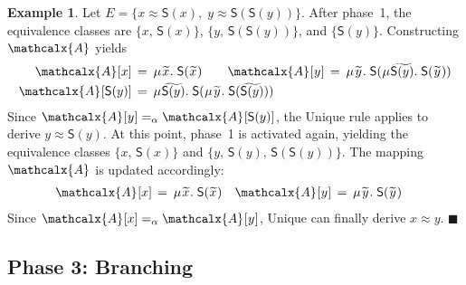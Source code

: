\documentclass[letter]{article}
\newcommand\yasx{\mskip.5mu y\mskip.5mu} %
\newcommand\MU{\vvthinspace\mu\vvthinspace}
\theoremstyle{plain}
\theoremstyle{definition}
\newtheorem{examplex}{Example}%
\newcommand\const[1]{\textsf{#1}}
\newcommand\xend{{\hfill$\scriptstyle\blacksquare$}}
\newcommand{\Ec}{E}
\newcommand{\rn}[1]{\textsf{#1}}
\newcommand{\teq}{\approx}
\newcommand{\ec}[1]{[#1]}
\newcommand{\Val}{\mathcalx{A}\vvthinspace}
\newcommand{\Varec}[1]{\vvthinspace\widetilde{#1}\vvthinspace}
\newcommand{\VAREC}[1]{\widetilde{\vphantom{\scriptstyle x^i}\smash{#1}}}
\newcommand{\aequiv}{\mathrel{=_\alpha}}
\newcommand\vvthinspace{\kern+0.041667em}
\begin{document}

\begin{examplex}
Let $\Ec = \{ x \teq \const{S}(x),\; y \teq \const{S}(\const{S}(y)) \}$.
After phase~1, the equivalence classes %
are
$\{ x,\, \const{S}(x) \}$,
$\{ y,\, \const{S}(\const{S}(y)) \}$,
and $\{ \const{S}(y) \}$.
Constructing $\Val$ yields
\begin{align*}
\Val \ec{x} & \,=\, \MU {\Varec{x}}.\; \const{S}(\Varec{x}) 
\kern2.0em %
\Val \ec{\yasx}  \,=\,
\MU {\Varec{\yasx}}.\; \const{S}(\smash{\MU {\VAREC{\const{S}(y)}}}.\; \const{S}( {\Varec{\yasx}} ) )
\\[-.5\jot]
\Val \ec{\const{S}(y)} & \,=\, 
\MU {\VAREC{\const{S}(y)}}.\; \const{S}(\MU {\Varec{\yasx}}.\; \const{S}( {\VAREC{\const{S}(y)}} ) )
\end{align*}
Since $\Val \ec{\yasx} \aequiv \Val \ec{\const{S}(y)}$,
the \rn{Unique} rule applies to derive $y \teq \const{S}(y)$.
%
At this point, phase~1 is activated again, %
yielding the equivalence classes
$\{ x,\, \const{S}(x) \}$ and
$\{ y,\, \const{S}(y),\allowbreak\, \const{S}(\const{S}(y)) \}$.
The mapping $\Val$ is updated accordingly:
\begin{align*}
\Val \ec{x} & \,=\, \MU {\Varec{x}}.\; \const{S}(\Varec{x})
&
\Val \ec{\yasx} & \,=\, \MU {\Varec{\yasx}}.\; \const{S}({\Varec{\yasx}})
\end{align*}
Since $\Val \ec{x} \aequiv \Val \ec{\yasx}$,
\rn{Unique} can finally derive $x \teq y$.
\xend
\end{examplex}

\subsection{Phase 3: Branching}
\end{document}
